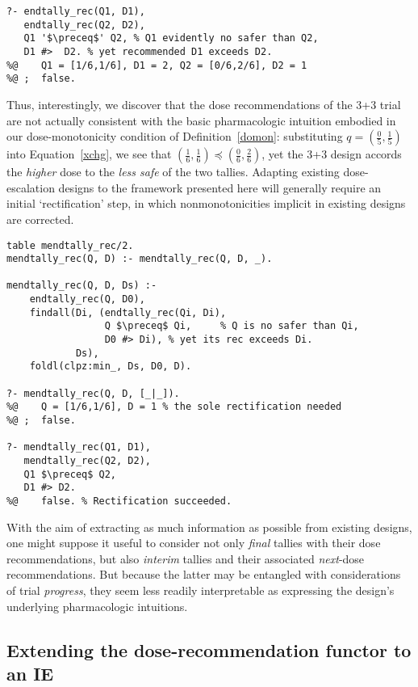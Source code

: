 \documentclass{article}
\begin{document}
\begin{lstlisting}
?- endtally_rec(Q1, D1),
   endtally_rec(Q2, D2),
   Q1 '$\preceq$' Q2, % Q1 evidently no safer than Q2,
   D1 #>  D2. % yet recommended D1 exceeds D2.
%@    Q1 = [1/6,1/6], D1 = 2, Q2 = [0/6,2/6], D2 = 1
%@ ;  false.
\end{lstlisting}

Thus, interestingly, we discover that the dose recommendations of the \mbox{3+3} trial are not actually consistent with the basic pharmacologic intuition embodied in our dose-monotonicity condition of Definition~\ref{domon}: substituting $q = (\frac{0}{5},\frac{1}{5})$ into Equation~\eqref{xchg}, we see that $(\frac{1}{6},\frac{1}{6}) \preceq (\frac{0}{6},\frac{2}{6})$, yet the \mbox{3+3} design accords the {\em higher} dose to the {\em less safe} of the two tallies.  Adapting existing dose-escalation designs to the framework presented here will generally require an initial `rectification' step, in which nonmonotonicities implicit in existing designs are corrected.

\begin{lstlisting}
table mendtally_rec/2.
mendtally_rec(Q, D) :- mendtally_rec(Q, D, _).

mendtally_rec(Q, D, Ds) :-
    endtally_rec(Q, D0),
    findall(Di, (endtally_rec(Qi, Di),
                 Q $\preceq$ Qi,     % Q is no safer than Qi,
                 D0 #> Di), % yet its rec exceeds Di.
            Ds),
    foldl(clpz:min_, Ds, D0, D).

?- mendtally_rec(Q, D, [_|_]).
%@    Q = [1/6,1/6], D = 1 % the sole rectification needed
%@ ;  false.

?- mendtally_rec(Q1, D1),
   mendtally_rec(Q2, D2),
   Q1 $\preceq$ Q2,
   D1 #> D2.
%@    false. % Rectification succeeded.
\end{lstlisting}

With the aim of extracting as much information as possible from existing designs, one might suppose it useful to consider not only {\em final} tallies with their dose recommendations, but also {\em interim} tallies and their associated {\em next}-dose recommendations.  But because the latter may be entangled with considerations of trial {\em progress}, they seem less readily interpretable as expressing the design's underlying pharmacologic intuitions.

\subsection{Extending the dose-recommendation functor to an IE}
\end{document}
